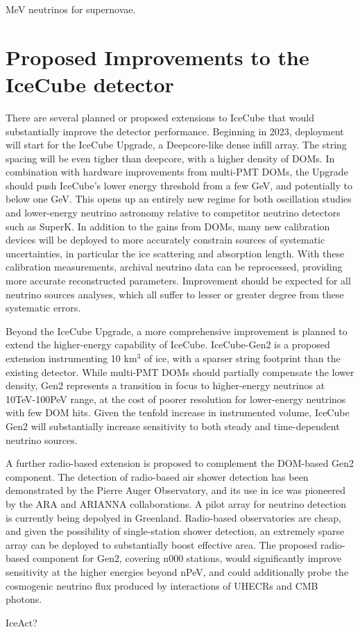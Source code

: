 MeV neutrinos for supernovae.

\section{Proposed Improvements to the IceCube detector}

There are several planned or proposed extensions to IceCube that would substantially improve the detector performance. Beginning in 2023, deployment will start for the IceCube Upgrade, a Deepcore-like dense infill array. The string spacing will be even tigher than deepcore, with a higher density of DOMs. In combination with hardware improvements from multi-PMT DOMs, the Upgrade should push IceCube's lower energy threshold from a few GeV, and potentially to below one GeV. This opens up an entirely new regime for both oscillation studies and lower-energy neutrino astronomy relative to competitor neutrino detectors such as SuperK. In addition to the gains from DOMs, many new calibration devices will be deployed to more accurately constrain sources of systematic uncertainties, in particular the ice scattering and absorption length. With these calibration measurements, archival neutrino data can be reprocessed, providing more accurate reconstructed parameters. Improvement should be expected for all neutrino sources analyses, which all suffer to lesser or greater degree from these systematic errors. 

Beyond the IceCube Upgrade, a more comprehensive improvement is planned to extend the higher-energy capability of IceCube. IceCube-Gen2 is a proposed extension instrumenting 10 km$^{3}$ of ice, with a sparser string footprint than the existing detector. While multi-PMT DOMs should partially compensate the lower density, Gen2 represents a transition in focus to higher-energy neutrinos at 10TeV-100PeV range, at the cost of poorer resolution for lower-energy neutrinos with few DOM hits. Given the tenfold increase in instrumented volume, IceCube Gen2 will substantially increase sensitivity to both steady and time-dependent neutrino sources.

A further radio-based extension is proposed to complement the DOM-based Gen2 component. The detection of radio-based air shower detection has been demonstrated by the Pierre Auger Observatory, and its use in ice was pioneered by the ARA and ARIANNA collaborations. A pilot array for neutrino detection is currently being depolyed in Greenland. Radio-based observatories are cheap, and given the possibility of single-station shower detection, an extremely sparse array can be deployed to substantially boost effective area. The proposed radio-based component for Gen2, covering n000 stations, would significantly improve sensitivity at the higher energies beyond nPeV, and could additionally probe the cosmogenic neutrino flux produced by interactions of UHECRs and CMB photons.

IceAct?